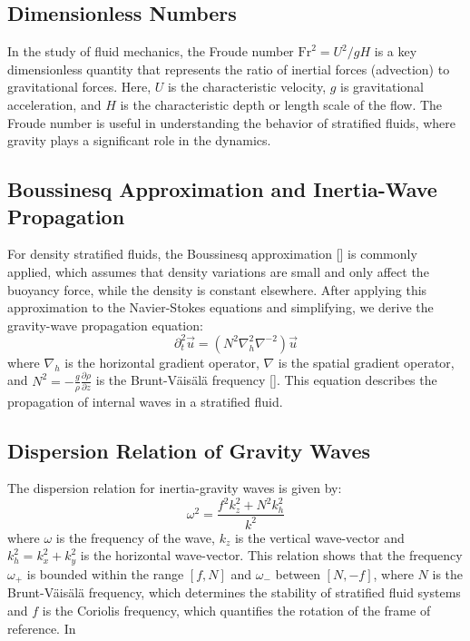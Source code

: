 \documentclass[final,5p,times,twocolumn,authoryear]{elsarticle}
\newcommand{\pd}[2]{\frac{\partial #1}{\partial #2}}
\begin{document}
\subsection{Dimensionless Numbers}

In the study of fluid mechanics, the Froude number $\mathrm{Fr}^2 = U^2 / gH$ is a key dimensionless quantity that represents the ratio of inertial forces (advection) to gravitational forces. Here, $U$ is the characteristic velocity, $g$ is gravitational acceleration, and $H$ is the characteristic depth or length scale of the flow. The Froude number is useful in understanding the behavior of stratified fluids, where gravity plays a significant role in the dynamics.

\subsection{Boussinesq Approximation and Inertia-Wave Propagation}

For density stratified fluids, the Boussinesq approximation [\cite{boussinesq_theorie_1897}] is commonly applied, which assumes that density variations are small and only affect the buoyancy force, while the density is constant elsewhere. After applying this approximation to the Navier-Stokes equations and simplifying, we derive the gravity-wave propagation equation:
\begin{equation}
\partial^2_t \vec{u} = \left( N^2 \nabla^2_h \nabla^{-2} \right) \vec{u} \label{eq:Wave Propagation}
\end{equation}
where $\nabla_h$ is the horizontal gradient operator, $\nabla$ is the spatial gradient operator, and $N^2 = -\frac{g}{\rho} \pd{\rho}{z}$ is the Brunt-Väisälä frequency [\cite{pedlosky_geophysical_1979}]. This equation describes the propagation of internal waves in a stratified fluid.

\subsection{Dispersion Relation of Gravity Waves}

The dispersion relation for inertia-gravity waves is given by:
\begin{equation}
\omega^2 = \frac{f^2 k_z^2 + N^2 k_h^2}{k^2} \label{eq:Dispersion relation}
\end{equation}
where $\omega$ is the frequency of the wave, $k_z$ is the vertical wave-vector and $k_h^2 = k_x^2 + k_y^2$ is the horizontal wave-vector. This relation shows that the frequency $\omega_+$ is bounded within the range $\left[ f, N \right]$ and $\omega_-$ between $\left[ N, -f \right]$, where $N$ is the Brunt-Väisälä frequency, which determines the stability of stratified fluid systems and $f$ is the Coriolis frequency, which quantifies the rotation of the frame of reference. In 
\end{document}
